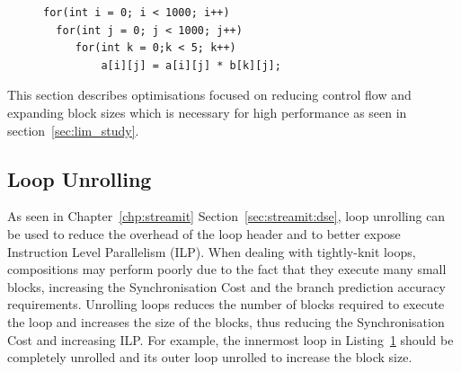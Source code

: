 
\begin{figure}[t]
\lstset{language=C,numbersep=4pt}
\begin{center}
\begin{lstlisting}
for(int i = 0; i < 1000; i++)
  for(int j = 0; j < 1000; j++)
     for(int k = 0;k < 5; k++)
         a[i][j] = a[i][j] * b[k][j];
\end{lstlisting}
\end{center}
\vspace{-2em}
\label{lst:small}
\end{figure}

This section describes optimisations focused on reducing control flow and expanding block sizes which is necessary for high performance as seen in section~\ref{sec:lim_study}.

\subsection{Loop Unrolling}
As seen in Chapter~\ref{chp:streamit} Section~\ref{sec:streamit:dse}, loop unrolling can be used to reduce the overhead of the loop header and to better expose Instruction Level Parallelism (ILP).
When dealing with tightly-knit loops, compositions may perform poorly due to the fact that they execute many small blocks, increasing the Synchronisation Cost and the branch prediction accuracy requirements.
Unrolling loops reduces the number of blocks required to execute the loop and increases the size of the blocks, thus reducing the Synchronisation Cost and increasing ILP.
For example, the innermost loop in Listing~\ref{lst:small} should be completely unrolled and its outer loop unrolled to increase the block size.

